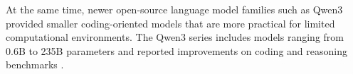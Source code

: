At the same time, newer open-source language model families such as Qwen3 provided smaller coding-oriented models that are more practical for limited computational environments. The Qwen3 series includes models ranging from 0.6B to 235B parameters and reported improvements on coding and reasoning benchmarks \cite{qwen32025report}.  


